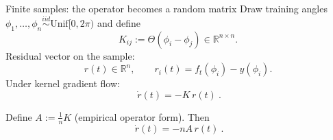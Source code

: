 \documentclass[10pt,aspectratio=169]{beamer}
\newcommand{\R}{\mathbb{R}}
\begin{document}
\begin{frame}{Finite samples: the operator becomes a random matrix}
	\small
	Draw training angles $\phi_1,\dots,\phi_n \overset{iid}{\sim}\mathrm{Unif}[0,2\pi)$ and define
	\[
		K_{ij} := \Theta(\phi_i-\phi_j)\in\R^{n\times n}.
	\]
	Residual vector on the sample:
	\[
		r(t)\in\R^n,\qquad r_i(t)=f_t(\phi_i)-y(\phi_i).
	\]
	Under kernel gradient flow:
	\[
		\boxed{\ \dot r(t) = -K\,r(t)\ }.
	\]

	Define $A:=\frac{1}{n}K$ (empirical operator form). Then
	\[
		\boxed{\ \dot r(t)=-nA\,r(t)\ }.
	\]

\end{frame}
\end{document}
